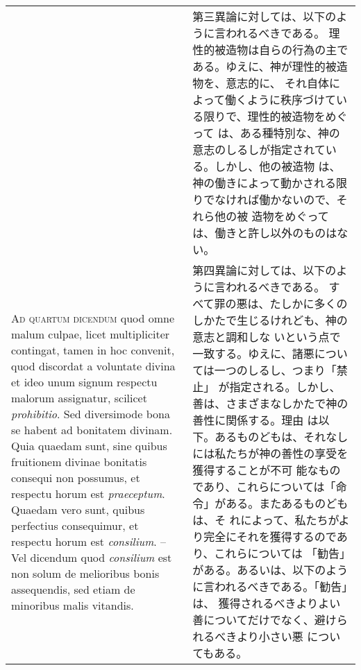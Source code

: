 \documentclass[10pt]{jsarticle} %
\begin{document}
\begin{longtable}{p{21em}p{21em}}
&

第三異論に対しては、以下のように言われるべきである。
理性的被造物は自らの行為の主である。ゆえに、神が理性的被造物を、意志的に、
 それ自体によって働くように秩序づけている限りで、理性的被造物をめぐって
 は、ある種特別な、神の意志のしるしが指定されている。しかし、他の被造物
 は、神の働きによって動かされる限りでなければ働かないので、それら他の被
 造物をめぐっては、働きと許し以外のものはない。


\\


{\scshape Ad quartum dicendum} quod omne malum culpae, licet
 multipliciter contingat, tamen in hoc convenit, quod discordat a
 voluntate divina et ideo unum signum respectu malorum assignatur,
 scilicet {\itshape prohibitio}. Sed diversimode bona se habent ad bonitatem
 divinam. Quia quaedam sunt, sine quibus fruitionem divinae bonitatis
 consequi non possumus, et respectu horum est {\itshape praeceptum}. Quaedam vero
 sunt, quibus perfectius consequimur, et respectu horum est
 {\itshape consilium}. --Vel dicendum quod {\itshape consilium} est non solum de melioribus
 bonis assequendis, sed etiam de minoribus malis vitandis.


&

第四異論に対しては、以下のように言われるべきである。
すべて罪の悪は、たしかに多くのしかたで生じるけれども、神の意志と調和しな
 いという点で一致する。ゆえに、諸悪については一つのしるし、つまり「禁止」
 が指定される。しかし、善は、さまざまなしかたで神の善性に関係する。理由
 は以下。あるものどもは、それなしには私たちが神の善性の享受を獲得することが不可
 能なものであり、これらについては「命令」がある。またあるものどもは、そ
 れによって、私たちがより完全にそれを獲得するのであり、これらについては
 「勧告」がある。あるいは、以下のように言われるべきである。「勧告」は、
 獲得されるべきよりよい善についてだけでなく、避けられるべきより小さい悪
 についてもある。


\end{longtable}
\end{document}
